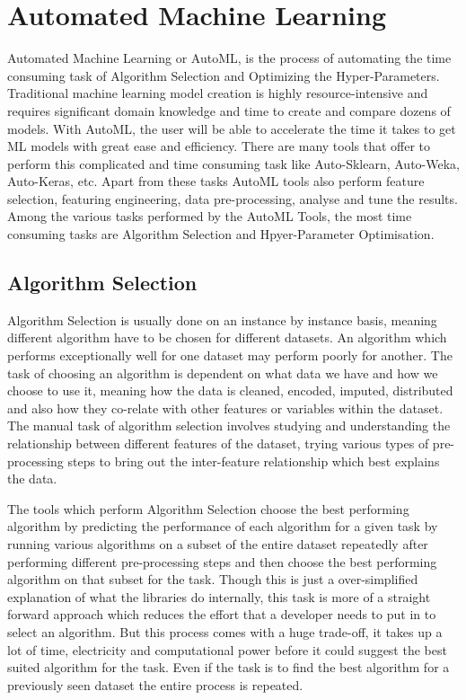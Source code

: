 \section{Automated Machine Learning}
Automated Machine Learning or AutoML, is the process of automating the time consuming task of Algorithm Selection and Optimizing the Hyper-Parameters. Traditional machine learning model creation is highly resource-intensive and requires significant domain knowledge and time to create and compare dozens of models. With AutoML, the user will be able to accelerate the time it takes to get ML models with great ease and efficiency. There are many tools that offer to perform this complicated and time consuming task like Auto-Sklearn, Auto-Weka, Auto-Keras, etc. Apart from these tasks AutoML tools also perform feature selection, featuring engineering, data pre-processing, analyse  and tune the results. Among the various tasks performed by the AutoML Tools, the most time consuming tasks are Algorithm Selection and Hpyer-Parameter Optimisation. 

\subsection{Algorithm Selection}
Algorithm Selection is usually done on an instance by instance basis, meaning different algorithm have to be chosen for different datasets. An algorithm which performs exceptionally well for one dataset may perform poorly for another. The task of choosing an algorithm is dependent on what data we have and how we choose to use it, meaning how the data is cleaned, encoded, imputed, distributed and also how they co-relate with other features or variables within the dataset. The manual task of algorithm selection involves studying and understanding the relationship between different features of the dataset, trying various types of pre-processing steps to bring out the inter-feature relationship which best explains the data. 

The tools which perform Algorithm Selection choose the best performing algorithm by predicting the performance of each algorithm for a given task by running various algorithms on a subset of the entire dataset repeatedly after performing different pre-processing steps and then choose the best performing algorithm on that subset for the task. Though this is just a over-simplified explanation of what the libraries do internally, this task is more of a straight forward approach which reduces the effort that a developer needs to put in to select an algorithm. But this process comes with a huge trade-off, it takes up a lot of time, electricity and computational power before it could suggest the best suited algorithm for the task. Even if the task is to find the best algorithm for a previously seen dataset the entire process is repeated.

